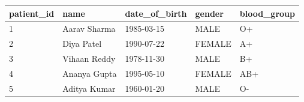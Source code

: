 {\scriptsize\setlength{\tabcolsep}{3pt}\begin{tabular}{lllll}\toprule
\textbf{patient\_id} & \textbf{name} & \textbf{date\_of\_birth} & \textbf{gender} & \textbf{blood\_group} \\\midrule
1 & Aarav Sharma & 1985-03-15 & MALE & O+ \\
2 & Diya Patel & 1990-07-22 & FEMALE & A+ \\
3 & Vihaan Reddy & 1978-11-30 & MALE & B+ \\
4 & Ananya Gupta & 1995-05-10 & FEMALE & AB+ \\
5 & Aditya Kumar & 1960-01-20 & MALE & O- \\
\bottomrule\end{tabular}}
